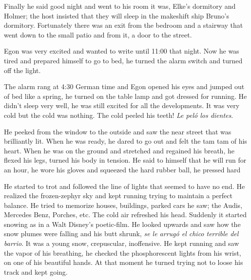 \documentclass[smalldemyvopaper,11pt,twoside,onecolumn,openright,extrafontsizes]{memoir}
\begin{document}
Finally he said good night and went to his room it was, Elke’s dormitory and Holmer; the host insisted that they will sleep in the makeshift ship Bruno’s dormitory. Fortunately there was an exit from the bedroom and a stairway that went down to the small patio and from it,  a door to the street.

Egon was very excited and wanted to write until 11:00 that night. Now he was tired and prepared himself to go to bed, he turned the alarm switch and turned off the light.

The alarm rang at 4:30 German time and Egon opened his eyes and jumped out of bed like a spring, he turned on the table lamp and got dressed for running. He didn’t sleep very well, he was still excited for all the developments. It was very cold but the cold was nothing. The cold peeled his teeth! \textit{Le peló los dientes}.

He peeked from the window to the outside and saw the near street that was brilliantly lit. When he was ready, he dared to go out and felt the tam tam of his heart. When he was on the ground and stretched and regained his breath, he flexed his legs, turned his body in tension. He said to himself that he will run for an hour, he wore his gloves and squeezed the hard rubber ball, he pressed hard

He started to trot and followed the line of lights that seemed to have no end. He realized the frozen-zephyr sky and kept running trying to maintain a perfect balance. He tried to memorize houses, buildings, parked cars he saw; the Audis, Mercedes Benz, Porches, etc. The cold air refreshed his head. Suddenly it started snowing as in a Walt Disney’s poetic-film. He looked upwards and saw how the snow plumes were falling and his butt shrunk, \textit{se le arrugó el chico terrible del barrio}. It was a young snow, crepuscular, inoffensive. He kept running and saw the vapor of his breathing, he checked the phosphorescent lights from his wrist, on one of his beautiful hands. At that moment he turned trying not to loose his track and kept going. 
\end{document}
